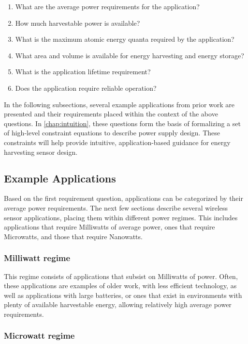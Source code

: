 \begin{enumerate}
    \item What are the average power requirements for the application?
    \item How much harvestable power is available?
    \item What is the maximum atomic energy quanta required by the application?
    \item What area and volume is available for energy harvesting and energy storage?
    \item What is the application lifetime requirement?
    \item Does the application require reliable operation?
\end{enumerate}

\noindent In the following subsections, several example applications from prior work are presented and their requirements placed within the context of the above questions. In \cref{chap:intuition}, these questions form the basis of formalizing a set of high-level constraint equations to describe power supply design.
These constraints will help provide intuitive, application-based guidance for energy harvesting sensor design.

\subsection{Example Applications}
Based on the first requirement question, applications can be categorized by their average power requirements. The next few sections describe several wireless sensor applications, placing them within different power regimes. This includes applications that require Milliwatts of average power, ones that require Microwatts, and those that require Nanowatts. 

\subsubsection{Milliwatt regime}
This regime consists of applications that subsist on Milliwatts of power. Often, these applications are examples of older work, with less efficient technology, as well as applications with large batteries, or ones that exist in environments with plenty of available harvestable energy, allowing relatively high average power requirements.

\subsubsection{Microwatt regime}
